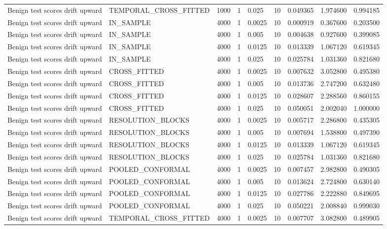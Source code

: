 \begin{tabular}{lllllllll}
Benign test scores drift upward & TEMPORAL\_CROSS\_FITTED & 1000 & 1 & 0.025 & 10 & 0.049365 & 1.974600 & 0.994185 \\
Benign test scores drift upward & IN\_SAMPLE & 4000 & 1 & 0.0025 & 10 & 0.000919 & 0.367600 & 0.203500 \\
Benign test scores drift upward & IN\_SAMPLE & 4000 & 1 & 0.005 & 10 & 0.004638 & 0.927600 & 0.399085 \\
Benign test scores drift upward & IN\_SAMPLE & 4000 & 1 & 0.0125 & 10 & 0.013339 & 1.067120 & 0.619345 \\
Benign test scores drift upward & IN\_SAMPLE & 4000 & 1 & 0.025 & 10 & 0.025784 & 1.031360 & 0.821680 \\
Benign test scores drift upward & CROSS\_FITTED & 4000 & 1 & 0.0025 & 10 & 0.007632 & 3.052800 & 0.495380 \\
Benign test scores drift upward & CROSS\_FITTED & 4000 & 1 & 0.005 & 10 & 0.013736 & 2.747200 & 0.632480 \\
Benign test scores drift upward & CROSS\_FITTED & 4000 & 1 & 0.0125 & 10 & 0.028607 & 2.288560 & 0.860155 \\
Benign test scores drift upward & CROSS\_FITTED & 4000 & 1 & 0.025 & 10 & 0.050051 & 2.002040 & 1.000000 \\
Benign test scores drift upward & RESOLUTION\_BLOCKS & 4000 & 1 & 0.0025 & 10 & 0.005717 & 2.286800 & 0.435305 \\
Benign test scores drift upward & RESOLUTION\_BLOCKS & 4000 & 1 & 0.005 & 10 & 0.007694 & 1.538800 & 0.497390 \\
Benign test scores drift upward & RESOLUTION\_BLOCKS & 4000 & 1 & 0.0125 & 10 & 0.013339 & 1.067120 & 0.619345 \\
Benign test scores drift upward & RESOLUTION\_BLOCKS & 4000 & 1 & 0.025 & 10 & 0.025784 & 1.031360 & 0.821680 \\
Benign test scores drift upward & POOLED\_CONFORMAL & 4000 & 1 & 0.0025 & 10 & 0.007457 & 2.982800 & 0.490305 \\
Benign test scores drift upward & POOLED\_CONFORMAL & 4000 & 1 & 0.005 & 10 & 0.013624 & 2.724800 & 0.630140 \\
Benign test scores drift upward & POOLED\_CONFORMAL & 4000 & 1 & 0.0125 & 10 & 0.027786 & 2.222880 & 0.849695 \\
Benign test scores drift upward & POOLED\_CONFORMAL & 4000 & 1 & 0.025 & 10 & 0.050221 & 2.008840 & 0.999030 \\
Benign test scores drift upward & TEMPORAL\_CROSS\_FITTED & 4000 & 1 & 0.0025 & 10 & 0.007707 & 3.082800 & 0.489905 \\

\end{tabular}
